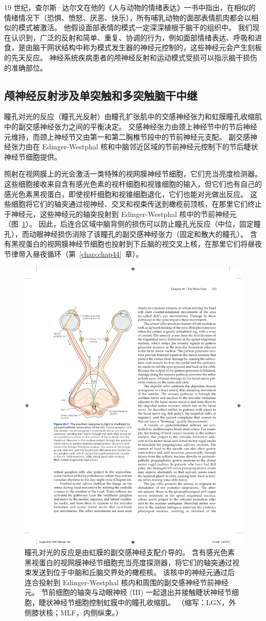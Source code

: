 19 世纪，查尔斯·达尔文在他的《人与动物的情绪表达》一书中指出，在相似的情绪情况下（恐惧、愤怒、厌恶、快乐），所有哺乳动物的面部表情肌肉都会以相似的模式被激活。
他假设面部表情的模式一定深深植根于脑干的组织中。
我们现在认识到，广泛的反射和简单、重复、协调的行为，例如面部情绪表达、呼吸和进食，是由脑干网状结构中称为模式发生器的神经元控制的，这些神经元会产生刻板的先天反应。
神经系统疾病患者的颅神经反射和运动模式受损可以指示脑干损伤的准确部位。



\subsection{颅神经反射涉及单突触和多突触脑干中继}

瞳孔对光的反应（瞳孔光反射）由瞳孔扩张肌中的交感神经张力和虹膜瞳孔收缩肌中的副交感神经张力之间的平衡决定。
交感神经张力由颈上神经节中的节后神经元维持，而颈上神经节又由第一和第二胸椎节段中的节前神经元支配。
副交感神经张力由在 Edinger-Westphal 核和中脑邻近区域的节前神经元控制下的节后睫状神经节细胞提供。


照射在视网膜上的光会激活一类特殊的视网膜神经节细胞，它们充当亮度检测器。
这些细胞接收来自含有感光色素的视杆细胞和视锥细胞的输入，但它们也有自己的感光色素黑视蛋白，即使视杆细胞和视锥细胞退化，它们也能对光做出反应。
这些细胞将它们的轴突通过视神经、交叉和视束传送到橄榄前顶核，在那里它们终止于神经元，这些神经元的轴突投射到 Edinger-Westphal 核中的节前神经元（图~\ref{fig:40_7}）。
因此，后连合区域中脑背侧的损伤可以防止瞳孔光反应（中位，固定瞳孔），而动眼神经损伤消除了该瞳孔的副交感神经张力（固定和散大的瞳孔）。
含有黑视蛋白的视网膜神经节细胞也投射到下丘脑的视交叉上核，在那里它们将昼夜节律带入昼夜循环（第~\ref{chap:chap44}~章）。


\begin{figure}[htbp]
	\centering
	\includegraphics[width=0.45\linewidth]{chap40/fig_40_7}
	\caption{瞳孔对光的反应是由虹膜的副交感神经支配介导的。 含有感光色素黑视蛋白的视网膜神经节细胞充当亮度探测器，将它们的轴突通过视束发送到位于中脑和丘脑交界处的橄榄核。 该核中的神经元通过后连合投射到 Edinger-Westphal 核内和周围的副交感神经节前神经元。 节前细胞的轴突与动眼神经 (III) 一起退出并接触睫状神经节细胞，睫状神经节细胞控制虹膜中的瞳孔收缩肌。 （缩写：LGN，外侧膝状核；MLF，内侧纵束。）}
	\label{fig:40_7}
\end{figure}



